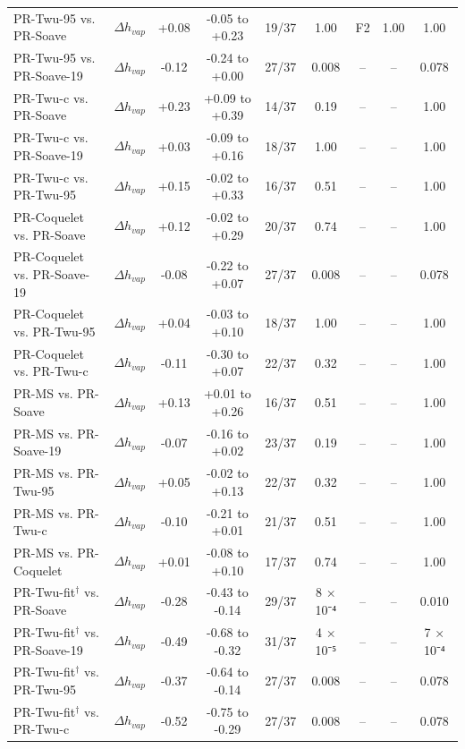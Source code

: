 \begin{table}[H]
\begin{tabular}{llccccccc}
PR-Twu-95 vs. PR-Soave & $\Delta h_{vap}$ & +0.08 & -0.05 to +0.23 & 19/37 & 1.00 & F2 & 1.00 & 1.00 \\
PR-Twu-95 vs. PR-Soave-19 & $\Delta h_{vap}$ & -0.12 & -0.24 to +0.00 & 27/37 & 0.008 & -- & -- & 0.078 \\
PR-Twu-c vs. PR-Soave & $\Delta h_{vap}$ & +0.23 & +0.09 to +0.39 & 14/37 & 0.19 & -- & -- & 1.00 \\
PR-Twu-c vs. PR-Soave-19 & $\Delta h_{vap}$ & +0.03 & -0.09 to +0.16 & 18/37 & 1.00 & -- & -- & 1.00 \\
PR-Twu-c vs. PR-Twu-95 & $\Delta h_{vap}$ & +0.15 & -0.02 to +0.33 & 16/37 & 0.51 & -- & -- & 1.00 \\
PR-Coquelet vs. PR-Soave & $\Delta h_{vap}$ & +0.12 & -0.02 to +0.29 & 20/37 & 0.74 & -- & -- & 1.00 \\
PR-Coquelet vs. PR-Soave-19 & $\Delta h_{vap}$ & -0.08 & -0.22 to +0.07 & 27/37 & 0.008 & -- & -- & 0.078 \\
PR-Coquelet vs. PR-Twu-95 & $\Delta h_{vap}$ & +0.04 & -0.03 to +0.10 & 18/37 & 1.00 & -- & -- & 1.00 \\
PR-Coquelet vs. PR-Twu-c & $\Delta h_{vap}$ & -0.11 & -0.30 to +0.07 & 22/37 & 0.32 & -- & -- & 1.00 \\
PR-MS vs. PR-Soave & $\Delta h_{vap}$ & +0.13 & +0.01 to +0.26 & 16/37 & 0.51 & -- & -- & 1.00 \\
PR-MS vs. PR-Soave-19 & $\Delta h_{vap}$ & -0.07 & -0.16 to +0.02 & 23/37 & 0.19 & -- & -- & 1.00 \\
PR-MS vs. PR-Twu-95 & $\Delta h_{vap}$ & +0.05 & -0.02 to +0.13 & 22/37 & 0.32 & -- & -- & 1.00 \\
PR-MS vs. PR-Twu-c & $\Delta h_{vap}$ & -0.10 & -0.21 to +0.01 & 21/37 & 0.51 & -- & -- & 1.00 \\
PR-MS vs. PR-Coquelet & $\Delta h_{vap}$ & +0.01 & -0.08 to +0.10 & 17/37 & 0.74 & -- & -- & 1.00 \\
PR-Twu-fit$^{\dagger}$ vs. PR-Soave & $\Delta h_{vap}$ & -0.28 & -0.43 to -0.14 & 29/37 & 8 × 10⁻⁴ & -- & -- & 0.010 \\
PR-Twu-fit$^{\dagger}$ vs. PR-Soave-19 & $\Delta h_{vap}$ & -0.49 & -0.68 to -0.32 & 31/37 & 4 × 10⁻⁵ & -- & -- & 7 × 10⁻⁴ \\
PR-Twu-fit$^{\dagger}$ vs. PR-Twu-95 & $\Delta h_{vap}$ & -0.37 & -0.64 to -0.14 & 27/37 & 0.008 & -- & -- & 0.078 \\
PR-Twu-fit$^{\dagger}$ vs. PR-Twu-c & $\Delta h_{vap}$ & -0.52 & -0.75 to -0.29 & 27/37 & 0.008 & -- & -- & 0.078 \\

\end{tabular}
\end{table}
